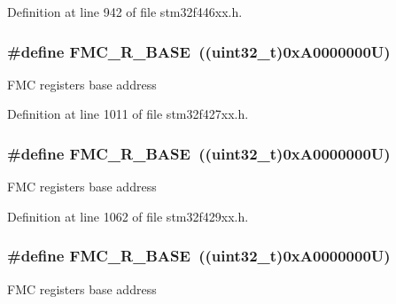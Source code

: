 Definition at line 942 of file stm32f446xx.\+h.

\subsubsection[{\texorpdfstring{F\+M\+C\+\_\+\+R\+\_\+\+B\+A\+SE}{FMC_R_BASE}}]{\setlength{\rightskip}{0pt plus 5cm}\#define F\+M\+C\+\_\+\+R\+\_\+\+B\+A\+SE~((uint32\+\_\+t)0x\+A0000000\+U)}\hypertarget{group___peripheral__memory__map_ga7a599164cd92798542bc6288793d1ed5}{}\label{group___peripheral__memory__map_ga7a599164cd92798542bc6288793d1ed5}
F\+MC registers base address 

Definition at line 1011 of file stm32f427xx.\+h.

\subsubsection[{\texorpdfstring{F\+M\+C\+\_\+\+R\+\_\+\+B\+A\+SE}{FMC_R_BASE}}]{\setlength{\rightskip}{0pt plus 5cm}\#define F\+M\+C\+\_\+\+R\+\_\+\+B\+A\+SE~((uint32\+\_\+t)0x\+A0000000\+U)}\hypertarget{group___peripheral__memory__map_ga7a599164cd92798542bc6288793d1ed5}{}\label{group___peripheral__memory__map_ga7a599164cd92798542bc6288793d1ed5}
F\+MC registers base address 

Definition at line 1062 of file stm32f429xx.\+h.

\subsubsection[{\texorpdfstring{F\+M\+C\+\_\+\+R\+\_\+\+B\+A\+SE}{FMC_R_BASE}}]{\setlength{\rightskip}{0pt plus 5cm}\#define F\+M\+C\+\_\+\+R\+\_\+\+B\+A\+SE~((uint32\+\_\+t)0x\+A0000000\+U)}\hypertarget{group___peripheral__memory__map_ga7a599164cd92798542bc6288793d1ed5}{}\label{group___peripheral__memory__map_ga7a599164cd92798542bc6288793d1ed5}
F\+MC registers base address 

